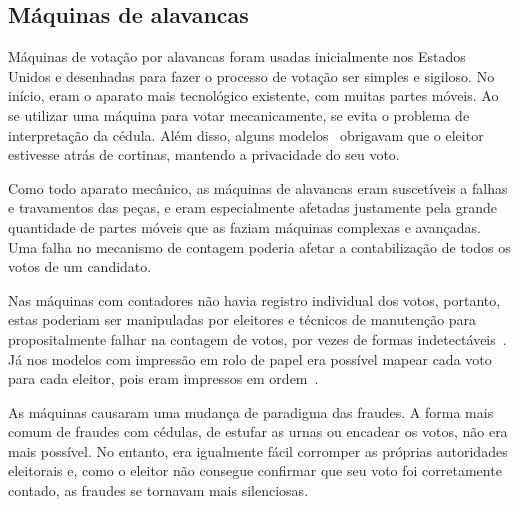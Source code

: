 \subsection{Máquinas de alavancas}

Máquinas de votação por alavancas foram usadas inicialmente nos Estados Unidos
e desenhadas para fazer o processo de votação ser simples e sigiloso. No
início, eram o aparato mais tecnológico existente, com muitas partes móveis. Ao
se utilizar uma máquina para votar mecanicamente, se evita o problema de
interpretação da cédula. Além disso, alguns
modelos~\nocite{gillespie1899voting} obrigavam que o eleitor estivesse atrás de
cortinas, mantendo a privacidade do seu voto.

Como todo aparato mecânico, as máquinas de alavancas eram suscetíveis a falhas
e travamentos das peças, e eram especialmente afetadas justamente pela grande
quantidade de partes móveis que as faziam máquinas complexas e avançadas. Uma
falha no mecanismo de contagem poderia afetar a contabilização de todos os
votos de um candidato.

Nas máquinas com contadores não havia registro individual dos votos, portanto,
estas poderiam ser manipuladas por eleitores e técnicos de manutenção para
propositalmente falhar na contagem de votos, por vezes de formas
indetectáveis~\cite[p.~42-45]{jones2012broken}. Já nos modelos com impressão em
rolo de papel era possível mapear cada voto para cada eleitor, pois eram
impressos em ordem~\cite[p.~26]{jones2012broken}.

As máquinas causaram uma mudança de paradigma das fraudes. A forma mais comum
de fraudes com cédulas, de estufar as urnas ou encadear os votos, não era mais
possível. No entanto, era igualmente fácil corromper as próprias autoridades
eleitorais e, como o eleitor não consegue confirmar que seu voto foi
corretamente contado, as fraudes se tornavam mais silenciosas.

